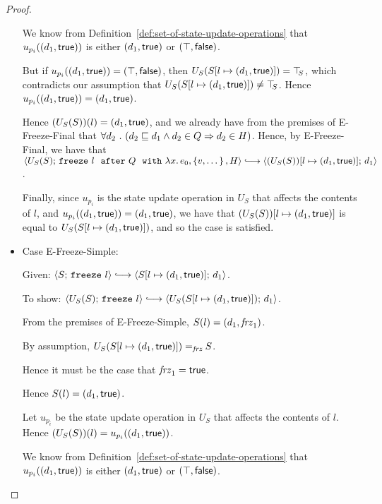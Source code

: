 \begin{proof}
\begin{itemize}
      We know from Definition~\ref{def:set-of-state-update-operations}
      that $u_{p_i}((d_1, \textsf{true}))$ is either
      $(d_1, \textsf{true})$ or $(\top, \textsf{false})$.

      But if $u_{p_i}((d_1, \textsf{true})) =
      (\top, \textsf{false})$, then
      $U_S(S[l \mapsto (d_1, \textsf{true})]) = \top\hspace{-0.85mm}_{S}$, which contradicts
      our assumption that $U_S(S[l \mapsto (d_1, \textsf{true})]) \neq
      \top\hspace{-0.85mm}_{S}$.  Hence $u_{p_i}((d_1, \textsf{true})) =
      (d_1, \textsf{true})$.

      Hence $(U_S(S))(l) = (d_1, \textsf{true})$, and we already
      have from the premises of {\sc E-Freeze-Final} that
      $\forall{d_2} ~.~ ( {d_2 \sqsubseteq d_1 \land d_2 \in Q}
      \Rightarrow d_2 \in H)$.  Hence, by {\sc E-Freeze-Final}, we
      have that
      $\config{U_S(S)}{\freezeafterfull{l}{Q}{\lam{x}{e_0}}{\setof{v,
            \dots}}{H}} \parstepsto
      \config{\extS{(U_S(S))}{l}{d_1}{\frozentrue}}{d_1}$.

      Finally, since $u_{p_i}$ is the state update operation in $U_S$
      that affects the contents of $l$, and
      $u_{p_i}((d_1, \textsf{true})) = (d_1, \textsf{true})$,
      we have that $(U_S(S))[l \mapsto (d_1, \textsf{true})]$ is equal to
      $U_S(S[l \mapsto (d_1, \textsf{true})])$, and so the case is
      satisfied.

    \item Case {\sc E-Freeze-Simple}:

      Given: $\config{S}{\freeze{l}} \parstepsto
      \config{\extS{S}{l}{d_1}{\frozentrue}}{d_1}$.

      To show: $\config{U_S(S)}{\freeze{l}} \parstepsto
      \config{U_S(\extS{S}{l}{d_1}{\frozentrue})}{d_1}$.

      From the premises of {\sc E-Freeze-Simple}, $S(l) =
      (d_1, \mathit{frz}_1)$.

      By assumption, $U_S(S[l \mapsto (d_1, \textsf{true})]) =_{\textit{frz}} S$.

      Hence it must be the case that $\mathit{frz}_1 = \textsf{true}$.

      Hence $S(l) = (d_1, \textsf{true})$.

      Let $u_{p_i}$ be the state update operation in $U_S$ that
      affects the contents of $l$.  Hence $(U_S(S))(l) =
      u_{p_i}((d_1, \textsf{true}))$.

      We know from Definition~\ref{def:set-of-state-update-operations}
      that $u_{p_i}((d_1, \textsf{true}))$ is either
      $(d_1, \textsf{true})$ or $(\top, \textsf{false})$.


\end{itemize}
\end{proof}
